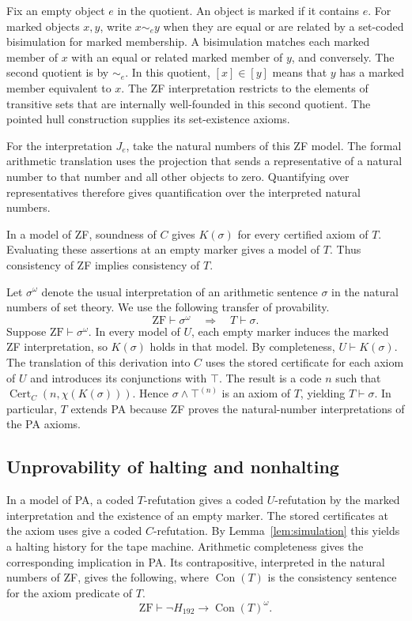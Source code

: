 \documentclass[11pt,letterpaper]{article}
\newcommand{\ZF}{\mathrm{ZF}}
\newcommand{\Con}{\operatorname{Con}}
\newcommand{\Halt}{H_{192}}
\begin{document}
Fix an empty object $e$ in the quotient. An object is marked if
it contains $e$. For marked objects $x,y$, write $x\sim_e y$ when
they are equal or are related by a set-coded bisimulation for
marked membership. A bisimulation matches each marked member
of $x$ with an equal or related marked member of $y$, and
conversely. The second quotient is by $\sim_e$. In this quotient,
$[x]\in[y]$ means that $y$ has a marked member equivalent to $x$.
The ZF interpretation restricts to the elements of transitive
sets that are internally well-founded in this second quotient.
The pointed hull construction supplies its set-existence
axioms.

For the interpretation $J_e$, take the natural numbers of this
ZF model. The formal arithmetic translation uses the projection
that sends a representative of a natural number to that number
and all other objects to zero. Quantifying over representatives
therefore gives quantification over the interpreted natural
numbers.

In a model of ZF, soundness of $C$ gives $K(\sigma)$ for every
certified axiom of $T$. Evaluating these assertions at an empty
marker gives a model of $T$. Thus consistency of ZF implies
consistency of $T$.

Let $\sigma^\omega$ denote the usual interpretation of an
arithmetic sentence $\sigma$ in the natural numbers of set theory.
We use the following transfer of provability.
\begin{equation}\label{eq:transfer}
  \ZF\vdash\sigma^\omega \quad\Longrightarrow\quad T\vdash\sigma .
\end{equation}
Suppose $\ZF\vdash\sigma^\omega$. In every model of $U$, each
empty marker induces the marked ZF interpretation, so
$K(\sigma)$ holds in that model. By completeness,
$U\vdash K(\sigma)$. The translation of this derivation into $C$
uses the stored certificate for each axiom of $U$ and introduces its
conjunctions with $\top$. The result is a code $n$ such that
$\operatorname{Cert}_C(n,\chi(K(\sigma)))$. Hence
$\sigma\land\top^{(n)}$ is an axiom of $T$, yielding $T\vdash\sigma$.
In particular, $T$ extends PA because ZF proves the natural-number
interpretations of the PA axioms.

\subsection{Unprovability of halting and nonhalting}

In a model of PA, a coded $T$-refutation gives a coded $U$-refutation
by the marked interpretation and the existence of an empty marker.
The stored certificates at the axiom uses give a coded
$C$-refutation. By Lemma~\ref{lem:simulation} this yields a halting
history for the tape machine. Arithmetic completeness gives the
corresponding implication in PA. Its contrapositive, interpreted in
the natural numbers of ZF, gives the following, where
$\Con(T)$ is the consistency sentence for the axiom predicate of $T$.
\begin{equation}\label{eq:consistency}
  \ZF\vdash\neg\Halt\longrightarrow\Con(T)^\omega .
\end{equation}
\end{document}
